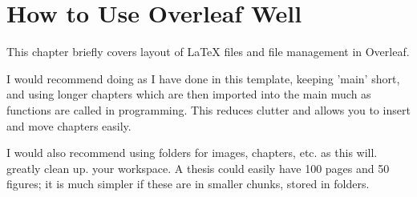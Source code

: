 \chapter{How to Use Overleaf Well}

This chapter briefly covers layout of \LaTeX{} files and file management in Overleaf.

I would recommend doing as I have done in this template, keeping 'main' short, and using longer chapters which are then imported into the main much as functions are called in programming. This reduces clutter and allows you to insert and move chapters easily.

I would also recommend using folders for images, chapters, etc. as this will. greatly clean up. your workspace. A thesis could easily have 100 pages and 50 figures; it is much simpler if these are in smaller chunks, stored in folders.
